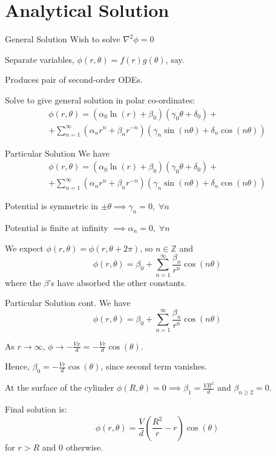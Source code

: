 \documentclass{beamer}
\newcommand{\be}{\begin{equation}}
\newcommand{\ee}{\end{equation}}
\begin{document}
\section{Analytical Solution}

\begin{frame}{General Solution}
Wish to solve $\nabla ^2 \phi = 0$

Separate variables, $\phi(r,\theta)=f(r)g(\theta)$, say.

Produces pair of second-order ODEs.

Solve to give general solution in polar co-ordinates:
%
\begin{multline}
\phi(r, \theta) = (\alpha_0 \ln(r) + \beta_0)(\gamma_0\theta + \delta_0) + 
\\
                + \sum_{n=1}^{\infty}(\alpha_n r^n+\beta_n r^{-n})(\gamma_n \sin(n\theta) + \delta_n \cos(n\theta))
\end{multline}
\end{frame}

\begin{frame}{Particular Solution}
We have
%
\begin{multline}
\phi(r, \theta) = (\alpha_0 \ln(r) + \beta_0)(\gamma_0\theta + \delta_0) + 
\\
                + \sum_{n=1}^{\infty}(\alpha_n r^n+\beta_n r^{-n})(\gamma_n \sin(n\theta) + \delta_n \cos(n\theta))
\end{multline}

Potential is symmetric in $\pm\theta \implies \gamma_n=0, \; \forall n$

Potential is finite at infinity $\implies \alpha_n=0, \; \forall n$

We expect $\phi(r, \theta)=\phi(r, \theta +2\pi)$, so $n \in \mathbb{Z}$ and
%
\be
\phi(r, \theta) = \beta_0 + \sum_{n=1}^{\infty} \frac{\beta_n}{r^n} \cos(n\theta)
\ee
%
where the $\beta$'s have absorbed the other constants.
\end{frame}

\begin{frame}{Particular Solution cont.}
We have
%
\be
\phi(r, \theta) = \beta_0 + \sum_{n=1}^{\infty} \frac{\beta_n}{r^n} \cos(n\theta)
\ee

As $r \rightarrow \infty$, $\phi \rightarrow -\frac{Vx}{d}=-\frac{Vr}{d}\cos(\theta)$.

Hence, $\beta_0=-\frac{Vr}{d}\cos(\theta)$, since second term vanishes.

At the surface of the cylinder $\phi(R,\theta) = 0 \implies \beta_1=\frac{VR^2}{d}$ and
$\beta_{n \geq 2} = 0$.

Final solution is:
%
\be
\phi(r, \theta) = \frac{V}{d}(\frac{R^2}{r}-r)\cos(\theta)
\ee
for $r>R$ and $0$ otherwise.

\end{frame}
\end{document}
